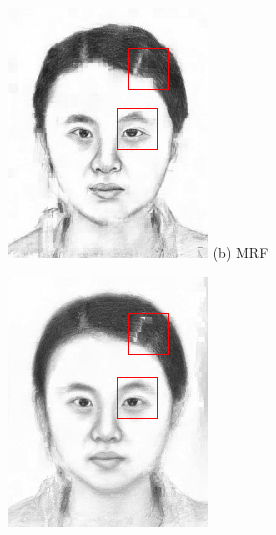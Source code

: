 \documentclass[10pt,twocolumn,letterpaper]{article}
\begin{document}
\begin{figure}[t]
\begin{minipage}[t]{0.24\linewidth}
\centering
\includegraphics[width=1\linewidth]{img/example_mrf.png}
(b) MRF\cite{wang2009face}
\end{minipage}
\begin{minipage}[t]{0.24\linewidth}
\centering
\includegraphics[width=1\linewidth]{img/example_wmrf.png}

\end{minipage}
\end{figure}
\end{document}
